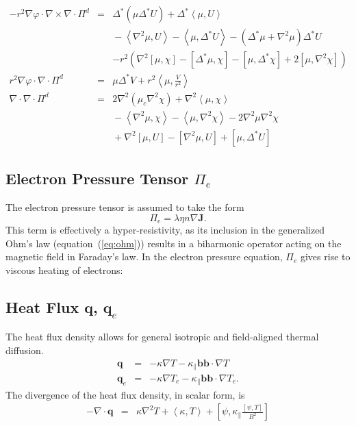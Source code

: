 \documentclass[draft]{book}
\renewcommand{\vec}[1]{\ensuremath{\mathbf{#1}}}
\newcommand{\tensor}[1]{\mathsf{#1}}
\newcommand{\tor}{\varphi}              %
\renewcommand{\j}{\vec{J}}
\newcommand{\q}{\vec{q}}
\renewcommand{\P}{\tensor{\Pi}}
\renewcommand{\b}{\vec{b}}
\newcommand{\grad}[1]{\nabla #1}
\renewcommand{\div}[1]{\nabla \cdot #1}
\newcommand{\curl}[1]{\nabla \times #1}
\newcommand{\gs}[1]{\Delta^* #1}
\newcommand{\lp}[1]{\nabla^2 #1}
\newcommand{\pb}[2]{\left[#1,#2\right]}
\newcommand{\ip}[2]{\left\langle  #1,#2\right\rangle}
\begin{document}
\begin{eqnarray}
  -r^2 \grad{\tor} \cdot \curl{\div \P^d} & = & 
   \gs{(\mu \gs{U})} + \gs{\ip{\mu}{U}} \\ 
   && \mbox{} - \ip{\lp{\mu}}{U} -
   \ip{\mu}{\gs{U}} - (\gs{\mu} + \lp{\mu})\gs{U} \nonumber \\
   && - \mbox{} r^2 \left(\lp{\pb{\mu}{\chi}} - \pb{\gs{\mu}}{\chi}
   - \pb{\mu}{\gs{\chi}} + 2 \pb{\mu}{\lp{\chi}} \right) \nonumber
   \\
   r^2 \grad \tor \cdot \div \P^d & = & \mu \gs{V} + r^2
   \ip{\mu}{\frac{V}{r^2}}
   \\
   \div \div \Pi^d & = & 2 \lp{(\mu_c \lp{\chi})} + \lp\ip{\mu}{\chi}
   \\  && \mbox{} - \ip{\lp\mu}{\chi} - \ip{\mu}{\lp\chi}
   - 2 \lp\mu\lp\chi \nonumber
   \\ && \mbox{}  + \lp\pb{\mu}{U} - \pb{\lp\mu}{U} + \pb{\mu}{\gs{U}}
   \nonumber
\end{eqnarray}


\subsection{Electron Pressure Tensor $\P_e$ 
  \label{sec:electron_pressure_tensor}}

The electron pressure tensor is assumed to take the form
\begin{equation}
  \label{eq:electron_pressure_tensor}
  \P_e = \lambda \eta n \grad{\j}.
\end{equation}
This term is effectively a hyper-resistivity, as its inclusion in the
generalized Ohm's law (equation~(\ref{eq:ohm})) results in a
biharmonic operator acting on the magnetic field in Faraday's law.  In
the electron pressure equation, $\P_e$ gives rise to viscous heating
of electrons:



\subsection{Heat Flux $\q$, $\q_e$}

The heat flux density allows for general isotropic and field-aligned
thermal diffusion.
\begin{eqnarray}
  \label{eq:heat_flux}
  \q & = & -\kappa \grad{T} - \kappa_\parallel \b \b \cdot \grad{T}\\
  \q_e & = & -\kappa \grad{T_e} - \kappa_\parallel \b \b \cdot \grad{T_e}.
\end{eqnarray}
The divergence of the heat flux density, in scalar form, is
\begin{eqnarray}
  -\div \q & = & \kappa \lp{T} + \ip{\kappa}{T} 
  + \pb{\psi}{\kappa_\parallel \frac{\pb{\psi}{T}}{B^2}}
\end{eqnarray}
\end{document}
